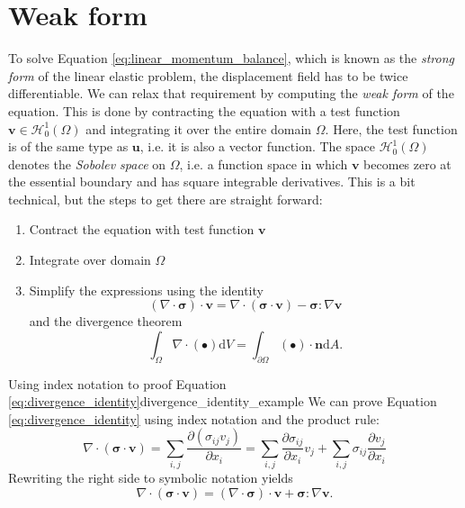 \section{Weak form}
To solve Equation \eqref{eq:linear_momentum_balance}, which is known as the \emph{strong form} of the linear elastic problem, the displacement field has to be twice differentiable. 
We can relax that requirement by computing the \emph{weak form} of the equation. This is done by contracting the equation with a test function $\mathbf{v} \in \mathcal{H}^1_0 (\Omega) $ and integrating it over the entire domain $\Omega$. Here, the test function is of the same type as $\mathbf{u}$, i.e. it is also a vector function. The space $\mathcal{H}^1_0 (\Omega)$ denotes the \emph{Sobolev space} on $\Omega$, i.e. a function space in which $\mathbf{v}$ becomes zero at the essential boundary and has square integrable derivatives. This is a bit technical, but the steps to get there are straight forward: 
\begin{enumerate}
    \item Contract the equation with test function $\mathbf{v}$
    \item Integrate over domain $\Omega$
    \item Simplify the expressions using the identity 
        \begin{equation}
            (\nabla \cdot \pmb{\sigma}) \cdot \mathbf{v} = \nabla \cdot (\pmb{\sigma} \cdot \mathbf{v}) - \pmb{\sigma} : \nabla \mathbf{v}
            \label{eq:divergence_identity}
        \end{equation}
    and the divergence theorem
    \begin{equation}
        \int_\Omega \nabla \cdot (\bullet) \text{d}V = \int_{\partial \Omega} (\bullet) \cdot \mathbf{n} \text{d}A.
        \label{eq:divergence_theorem}
    \end{equation}
\end{enumerate}

\begin{example}{Using index notation to proof Equation \ref{eq:divergence_identity}}{divergence_identity_example} 
    We can prove Equation \ref{eq:divergence_identity} using index notation and the product rule: 
    \begin{equation}
        \nabla \cdot (\pmb{\sigma} \cdot \mathbf{v}) = \sum_{i,j} \frac{\partial (\sigma_{ij} v_j)}{\partial x_i} = \sum_{i,j}\frac{\partial \sigma_{ij}}{\partial x_i} v_j + \sum_{i,j} \sigma_{ij} \frac{\partial v_j}{\partial x_i}
    \end{equation}
    Rewriting the right side to symbolic notation yields
    \begin{equation}
        \nabla \cdot (\pmb{\sigma} \cdot \mathbf{v}) = (\nabla \cdot \pmb{\sigma}) \cdot \mathbf{v} + \pmb{\sigma} : \nabla \mathbf{v}.
    \end{equation}
\end{example}

